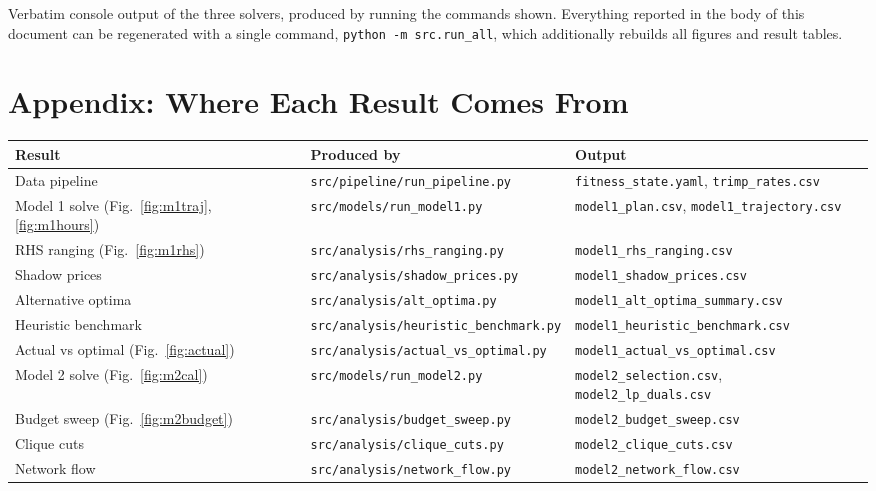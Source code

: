 \documentclass[11pt,a4paper]{article}
\begin{document}
Verbatim console output of the three solvers, produced by running the commands
shown. Everything reported in the body of this document can be regenerated with
a single command, \texttt{python -m src.run\_all}, which additionally rebuilds
all figures and result tables.



\section{Appendix: Where Each Result Comes From}
\label{sec:filemap}

\begin{table}[h]
\centering\footnotesize
\begin{tabular}{llp{6.1cm}}
\toprule
Result & Produced by & Output\\
\midrule
Data pipeline & \texttt{src/pipeline/run\_pipeline.py} & \texttt{fitness\_state.yaml}, \texttt{trimp\_rates.csv}\\
Model 1 solve (Fig.~\ref{fig:m1traj}, \ref{fig:m1hours}) & \texttt{src/models/run\_model1.py} & \texttt{model1\_plan.csv}, \texttt{model1\_trajectory.csv}\\
RHS ranging (Fig.~\ref{fig:m1rhs}) & \texttt{src/analysis/rhs\_ranging.py} & \texttt{model1\_rhs\_ranging.csv}\\
Shadow prices & \texttt{src/analysis/shadow\_prices.py} & \texttt{model1\_shadow\_prices.csv}\\
Alternative optima & \texttt{src/analysis/alt\_optima.py} & \texttt{model1\_alt\_optima\_summary.csv}\\
Heuristic benchmark & \texttt{src/analysis/heuristic\_benchmark.py} & \texttt{model1\_heuristic\_benchmark.csv}\\
Actual vs optimal (Fig.~\ref{fig:actual}) & \texttt{src/analysis/actual\_vs\_optimal.py} & \texttt{model1\_actual\_vs\_optimal.csv}\\
Model 2 solve (Fig.~\ref{fig:m2cal}) & \texttt{src/models/run\_model2.py} & \texttt{model2\_selection.csv}, \texttt{model2\_lp\_duals.csv}\\
Budget sweep (Fig.~\ref{fig:m2budget}) & \texttt{src/analysis/budget\_sweep.py} & \texttt{model2\_budget\_sweep.csv}\\
Clique cuts & \texttt{src/analysis/clique\_cuts.py} & \texttt{model2\_clique\_cuts.csv}\\
Network flow & \texttt{src/analysis/network\_flow.py} & \texttt{model2\_network\_flow.csv}\\

\end{tabular}
\end{table}
\end{document}
